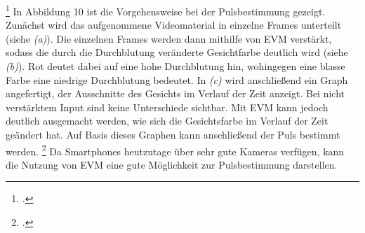 {\begin{figure}[h]
\end{figure}\footcitetext{MIT15} \newline
In Abbildung 10 ist die Vorgehensweise bei der Pulsbestimmung gezeigt. Zunächst wird das aufgenommene Videomaterial in einzelne Frames unterteilt (siehe \textit{(a)}). Die einzelnen Frames werden dann mithilfe von EVM verstärkt, sodass die durch die Durchblutung veränderte Gesichtfarbe deutlich wird (siehe \textit{(b)}). Rot deutet dabei auf eine hohe Durchblutung hin, wohingegen eine blasse Farbe eine niedrige Durchblutung bedeutet. In \textit{(c)} wird anschließend ein Graph angefertigt, der Ausschnitte des Gesichts im Verlauf der Zeit anzeigt. Bei nicht verstärktem Input sind keine Unterschiede sichtbar. Mit EVM kann jedoch deutlich ausgemacht werden, wie sich die Gesichtsfarbe im Verlauf der Zeit geändert hat. Auf Basis dieses Graphen kann anschließend der Puls bestimmt werden. \footcite[Vgl.][]{MIT15} \newline
Da Smartphones heutzutage über sehr gute Kameras verfügen, kann die Nutzung von EVM eine gute Möglichkeit zur Pulsbestimmung darstellen.
}
